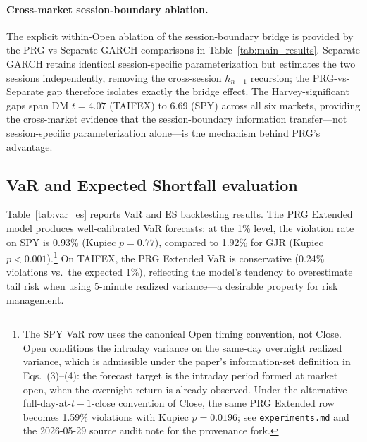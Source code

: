 \documentclass[11pt,a4paper]{article}
\begin{document}
\paragraph{Cross-market session-boundary ablation.} The explicit within-Open ablation of the session-boundary bridge is provided by the PRG-vs-Separate-GARCH comparisons in Table~\ref{tab:main_results}. Separate GARCH retains identical session-specific parameterization but estimates the two sessions independently, removing the cross-session $h_{n-1}$ recursion; the PRG-vs-Separate gap therefore isolates exactly the bridge effect. The Harvey-significant gaps span DM $t = 4.07$ (TAIFEX) to 6.69 (SPY) across all six markets, providing the cross-market evidence that the session-boundary information transfer---not session-specific parameterization alone---is the mechanism behind PRG's advantage.

\subsection{VaR and Expected Shortfall evaluation}

Table~\ref{tab:var_es} reports VaR and ES backtesting results. The PRG Extended model produces well-calibrated VaR forecasts: at the 1\% level, the violation rate on SPY is 0.93\% (Kupiec $p = 0.77$), compared to 1.92\% for GJR (Kupiec $p < 0.001$).\footnote{The SPY VaR row uses the canonical Open timing convention, not Close. Open conditions the intraday variance on the same-day overnight realized variance, which is admissible under the paper's information-set definition in Eqs.~(3)--(4): the forecast target is the intraday period formed at market open, when the overnight return is already observed. Under the alternative full-day-at-$t\!-\!1$-close convention of Close, the same PRG Extended row becomes 1.59\% violations with Kupiec $p = 0.0196$; see \texttt{experiments.md} and the 2026-05-29 source audit note for the provenance fork.} On TAIFEX, the PRG Extended VaR is conservative (0.24\% violations vs.\ the expected 1\%), reflecting the model's tendency to overestimate tail risk when using 5-minute realized variance---a desirable property for risk management.
\end{document}
